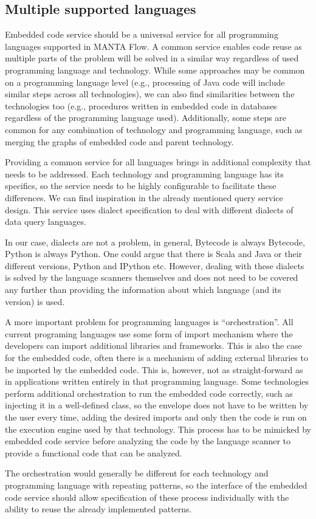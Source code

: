 \subsection{Multiple supported languages}
Embedded code service should be a universal service for all programming languages supported in MANTA Flow. A common service enables code reuse as multiple parts of the problem will be solved in a similar way regardless of used programming language and technology. While some approaches may be common on a programming language level (e.g., processing of Java code will include similar steps across all technologies), we can also find similarities between the technologies too (e.g., procedures written in embedded code in databases regardless of the programming language used). Additionally, some steps are common for any combination of technology and programming language, such as merging the graphs of embedded code and parent technology.
\par
Providing a common service for all languages brings in additional complexity that needs to be addressed. Each technology and programming language has its specifics, so the service needs to be highly configurable to facilitate these differences. We can find inspiration in the already mentioned query service design. This service uses dialect specification to deal with different dialects of data query languages. 
\par
In our case, dialects are not a problem, in general, Bytecode is always Bytecode, Python is always Python. One could argue that there is Scala and Java or their different versions, Python and IPython etc. However, dealing with these dialects is solved by the language scanners themselves and does not need to be covered any further than providing the information about which language (and its version) is used.
\par
A more important problem for programming languages is “orchestration”. All current programing languages use some form of import mechanism where the developers can import additional libraries and frameworks. This is also the case for the embedded code, often there is a mechanism of adding external libraries to be imported by the embedded code. This is, however, not as straight-forward as in applications written entirely in that programming language. Some technologies perform additional orchestration to run the embedded code correctly, such as injecting it in a well-defined class, so the envelope does not have to be written by the user every time, adding the desired imports and only then the code is run on the execution engine used by that technology. This process has to be mimicked by embedded code service before analyzing the code by the language scanner to provide a functional code that can be analyzed.
\par
The orchestration would generally be different for each technology and programming language with repeating patterns, so the interface of the embedded code service should allow specification of these process individually with the ability to reuse the already implemented patterns.

